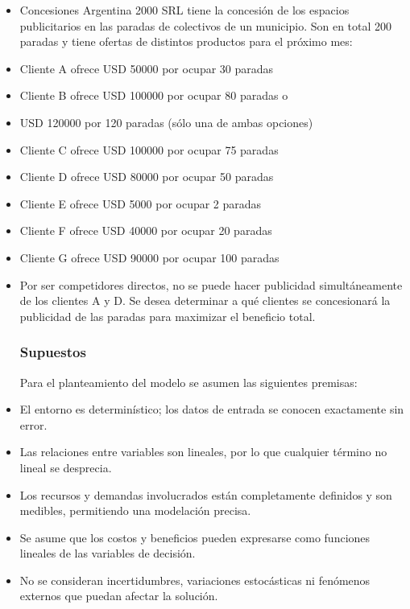 \documentclass[a4paper, 12pt]{article}
\begin{document}
\begin{itemize}
    \subsubsection{Enunciado}
    \item 
    Concesiones Argentina 2000 SRL tiene la concesión de los espacios publicitarios en las paradas de colectivos de un municipio. Son en total 200 paradas y tiene ofertas de distintos productos para el próximo mes: 
     \item Cliente A ofrece USD 50000 por ocupar 30 paradas 
     \item Cliente B ofrece USD 100000 por ocupar 80 paradas o \item USD 120000 por 120 paradas (sólo una de ambas opciones) 
     \item Cliente C ofrece USD 100000 por ocupar 75 paradas 
     \item Cliente D ofrece USD 80000 por ocupar 50 paradas 
     \item Cliente E ofrece USD 5000 por ocupar 2 paradas 
     \item Cliente F ofrece USD 40000 por ocupar 20 paradas 
     \item Cliente G ofrece USD 90000 por ocupar 100 paradas 
    \item Por ser competidores directos, no se puede hacer publicidad simultáneamente de los clientes A y D. Se desea determinar a qué clientes se concesionará la publicidad de las paradas para maximizar el beneficio total. 
    \subsubsection{Supuestos}
Para el planteamiento del modelo se asumen las siguientes premisas:
    \item El entorno es determinístico; los datos de entrada se conocen exactamente sin error.
    \item Las relaciones entre variables son lineales, por lo que cualquier término no lineal se desprecia.
    \item Los recursos y demandas involucrados están completamente definidos y son medibles, permitiendo una modelación precisa.
    \item Se asume que los costos y beneficios pueden expresarse como funciones lineales de las variables de decisión.
    \item No se consideran incertidumbres, variaciones estocásticas ni fenómenos externos que puedan afectar la solución.
\end{itemize}
\vspace{1.5cm}
\end{document}
